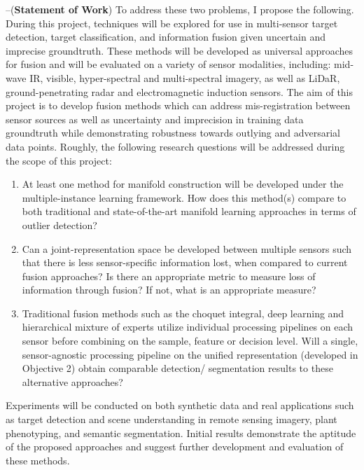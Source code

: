 \vspace{1cm}\noindent --(\textbf{Statement of Work}) \newline
To address these two problems, I propose the following.  During this project, techniques will be explored for use in multi-sensor target detection, target classification, and information fusion given uncertain and imprecise groundtruth.  These methods will be developed as universal approaches for fusion and will be evaluated on a variety of sensor modalities, including: mid-wave IR, visible, hyper-spectral and multi-spectral imagery, as well as LiDaR, ground-penetrating radar and electromagnetic induction sensors.  The aim of this project is to develop fusion methods which can address mis-registration between sensor sources as well as uncertainty and imprecision in training data groundtruth while demonstrating robustness towards outlying and adversarial data points. Roughly, the following research questions will be addressed during the scope of this project:
\begin{enumerate}
	\item At least one method for manifold construction will be developed under the multiple-instance learning framework.  How does this method(s) compare to both traditional and state-of-the-art manifold learning approaches in terms of outlier detection?
	\item Can a joint-representation space be developed between multiple sensors such that there is less sensor-specific information lost, when compared to current fusion approaches? Is there an appropriate metric to measure loss of information through fusion?  If not, what is an appropriate measure?
	\item Traditional fusion methods such as the choquet integral, deep learning and hierarchical mixture of experts utilize individual processing pipelines on each sensor before combining on the sample, feature or decision level.  Will a single, sensor-agnostic processing pipeline on the unified representation (developed in Objective 2) obtain comparable detection/ segmentation results to these alternative approaches?
\end{enumerate} 

Experiments will be conducted on both synthetic data and real applications such as target detection and scene understanding in remote sensing imagery, plant phenotyping, and semantic segmentation. Initial results demonstrate the aptitude of the proposed approaches and suggest further development and evaluation of these methods.

